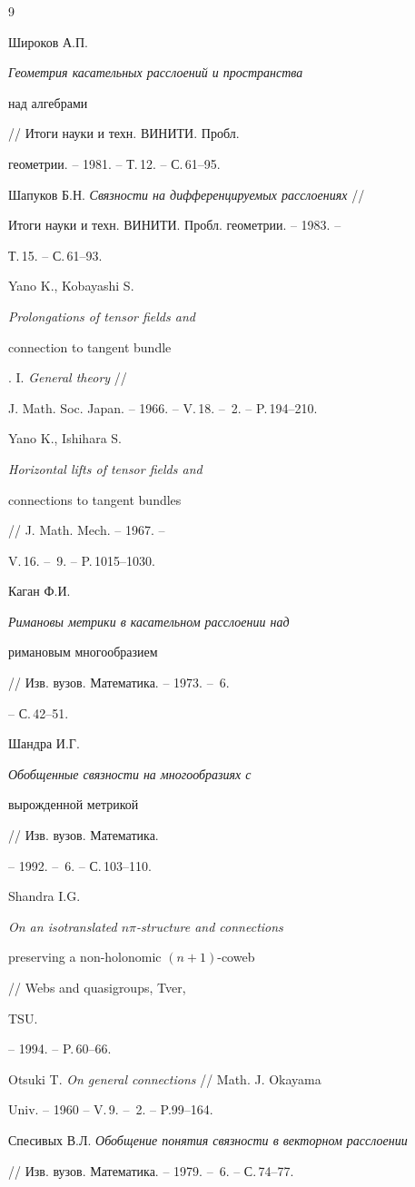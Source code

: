 \begin{thebibliography}{9}







Широков А.П. {\em Геометрия касательных расслоений и пространства


над алгебрами} // Итоги науки и техн. ВИНИТИ. Пробл.


геометрии. -- 1981. -- Т.\,12. -- С.\,61--95.




Шапуков Б.Н. {\em Связности на дифференцируемых расслоениях} //


Итоги науки и техн. ВИНИТИ. Пробл. геометрии. -- 1983. --


Т.\,15. -- С.\,61--93.




Yano K., Kobayashi S. {\em Prolongations of tensor fields and


connection to tangent bundle}. I. {\em General theory} //


J. Math. Soc. Japan. -- 1966. -- V.\,18. -- \No\,2. -- P.\,194--210.




Yano K., Ishihara S. {\em Horizontal lifts of tensor fields and


connections to tangent bundles} // J. Math. Mech. -- 1967. --


V.\,16. -- \No\,9. -- P.\,1015--1030.




Каган Ф.И. {\em Римановы метрики в касательном расслоении над


римановым многообразием} // Изв. вузов. Математика. -- 1973. -- \No\,6.


-- С.\,42--51.




Шандра И.Г. {\em Обобщенные связности на многообразиях с


вырожденной метрикой} // Изв. вузов. Математика.


-- 1992. -- \No\,6. -- С.\,103--110.




Shandra I.G. {\em On an isotranslated $n\pi$-structure and connections


preserving a non-holonomic $(n+1)$-coweb} // Webs and quasigroups, Tver,


TSU.


-- 1994. -- P.\,60--66.




Otsuki T. {\em On general connections} // Math. J. Okayama


Univ. -- 1960 -- V.\,9. -- \No\,2. -- P.99--164.




Спесивых В.Л. {\em Обобщение понятия связности в векторном расслоении}


// Изв. вузов. Математика. -- 1979. -- \No\,6. -- С.\,74--77.





\end{thebibliography}

